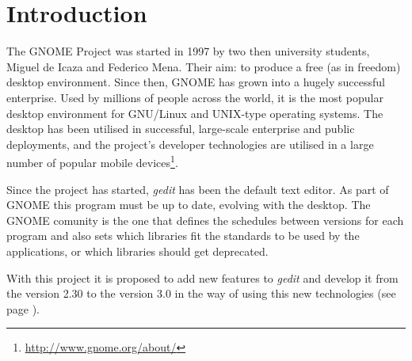 
\chapter{Introduction}

The GNOME Project was started in 1997 by two then university students, Miguel de Icaza and Federico Mena. Their aim: to produce a free (as in freedom) desktop environment. Since then, GNOME has grown into a hugely successful enterprise. Used by millions of people across the world, it is the most popular desktop environment for GNU/Linux and UNIX-type operating systems. The desktop has been utilised in successful, large-scale enterprise and public deployments, and the project’s developer technologies are utilised in a large number of popular mobile devices\footnote{\url{http://www.gnome.org/about/}}.

Since the project has started, \emph{gedit} has been the default text editor. As part of GNOME this program must be up to date, evolving with the desktop. The GNOME comunity is the one that defines the schedules between versions for each program and also sets which libraries fit the standards to be used by the applications, or which libraries should get deprecated.

With this project it is proposed to add new features to \emph{gedit} and develop it from the version 2.30 to the version 3.0 in the way of using this new technologies (see page \pageref{chap:Technologies}).
